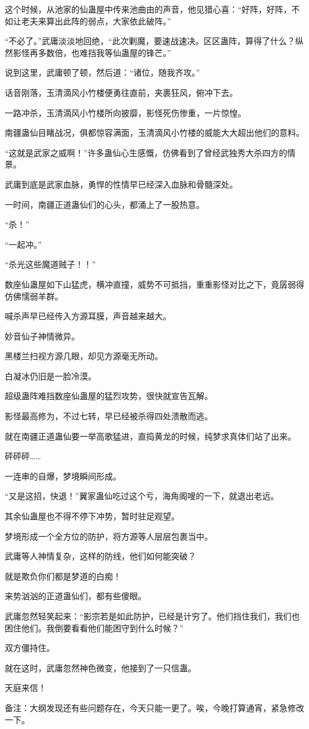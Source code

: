 \begin{this_body}
这个时候，从池家的仙蛊屋中传来池曲由的声音，他见猎心喜：“好阵，好阵，不如让老夫来算出此阵的弱点，大家依此破阵。”

“不必了。”武庸淡淡地回绝，“此次剿魔，要速战速决。区区蛊阵，算得了什么？纵然影怪再多数倍，也难挡我等仙蛊屋的锋芒。”

说到这里，武庸顿了顿，然后道：“诸位，随我齐攻。”

话音刚落，玉清滴风小竹楼便勇往直前，夹裹狂风，俯冲下去。

一路冲杀，玉清滴风小竹楼所向披靡，影怪死伤惨重，一片惊惶。

南疆蛊仙目睹战况，俱都惊容满面，玉清滴风小竹楼的威能大大超出他们的意料。

“这就是武家之威啊！”许多蛊仙心生感慨，仿佛看到了曾经武独秀大杀四方的情景。

武庸到底是武家血脉，勇悍的性情早已经深入血脉和骨髓深处。

一时间，南疆正道蛊仙们的心头，都涌上了一股热意。

“杀！”

“一起冲。”

“杀光这些魔道贼子！！”

数座仙蛊屋如下山猛虎，横冲直撞，威势不可抵挡，重重影怪对比之下，竟孱弱得仿佛懦弱羊群。

喊杀声早已经传入方源耳膜，声音越来越大。

妙音仙子神情微异。

黑楼兰扫视方源几眼，却见方源毫无所动。

白凝冰仍旧是一脸冷漠。

超级蛊阵难挡数座仙蛊屋的猛烈攻势，很快就宣告瓦解。

影怪最高修为，不过七转，早已经被杀得四处溃散而逃。

就在南疆正道蛊仙要一举高歌猛进，直捣黄龙的时候，纯梦求真体们站了出来。

砰砰砰……

一连串的自爆，梦境瞬间形成。

“又是这招，快退！”翼家蛊仙吃过这个亏，海角阁嗖的一下，就退出老远。

其余仙蛊屋也不得不停下冲势，暂时驻足观望。

梦境形成一个全方位的防护，将方源等人层层包裹当中。

武庸等人神情复杂，这样的防线，他们如何能突破？

就是欺负你们都是梦道的白痴！

来势汹汹的正道蛊仙们，都有些傻眼。

武庸忽然轻笑起来：“影宗若是如此防护，已经是计穷了。他们挡住我们，我们也困住他们。我倒要看看他们能困守到什么时候？”

双方僵持住。

就在这时，武庸忽然神色微变，他接到了一只信蛊。

天庭来信！

备注：大纲发现还有些问题存在，今天只能一更了。唉，今晚打算通宵，紧急修改一下。

\end{this_body}


